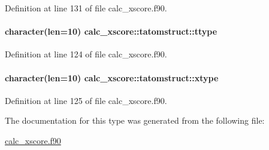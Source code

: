 Definition at line 131 of file calc\-\_\-xscore.\-f90.

\hypertarget{structcalc__xscore_1_1tatomstruct_aef1b094b680ec45cc2cbcbb1166a68e6}{
\paragraph[{ttype}]{\setlength{\rightskip}{0pt plus 5cm}character(len=10) calc\-\_\-xscore\-::tatomstruct\-::ttype}}\label{structcalc__xscore_1_1tatomstruct_aef1b094b680ec45cc2cbcbb1166a68e6}


Definition at line 124 of file calc\-\_\-xscore.\-f90.

\hypertarget{structcalc__xscore_1_1tatomstruct_a11752fe6a74949aa3d8267cd1ccd5916}{
\paragraph[{xtype}]{\setlength{\rightskip}{0pt plus 5cm}character(len=10) calc\-\_\-xscore\-::tatomstruct\-::xtype}}\label{structcalc__xscore_1_1tatomstruct_a11752fe6a74949aa3d8267cd1ccd5916}


Definition at line 125 of file calc\-\_\-xscore.\-f90.



The documentation for this type was generated from the following file\-:\begin{DoxyCompactItemize}
\item 
\hyperlink{calc__xscore_8f90}{calc\-\_\-xscore.\-f90}\end{DoxyCompactItemize}
